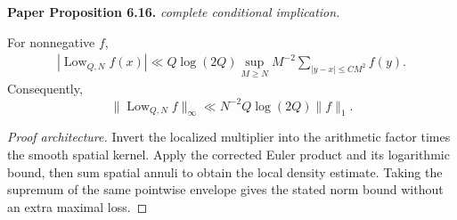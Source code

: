 \begin{lemma}
\label{prime_low}
\leanok
\par\medskip\noindent\textbf{Paper Proposition 6.16.} \textit{complete conditional implication.}\par
For nonnegative \(f\),
\begin{align}
 |\operatorname{Low}_{Q,N}f(x)|
 \ll Q\log(2Q)
 \sup_{M\geq N}M^{-2}
 \sum_{|y-x|\leq CM^2}f(y).
\end{align}
Consequently,
\[
 \|\operatorname{Low}_{Q,N}f\|_\infty
 \ll N^{-2}Q\log(2Q)\|f\|_1.
\]
\end{lemma}
\begin{proof}[Proof architecture]
\leanok
Invert the localized multiplier into the arithmetic factor times the smooth spatial kernel. Apply the corrected Euler product and its logarithmic bound, then sum spatial annuli to obtain the local density estimate. Taking the supremum of the same pointwise envelope gives the stated norm bound without an extra maximal loss.
\end{proof}

